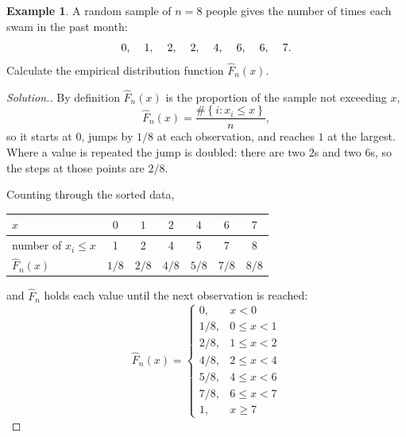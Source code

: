 \documentclass[11pt,a4paper]{article}
\theoremstyle{definition}
\newtheorem{example}[thm]{Example}
\newenvironment{solution}
  {\renewcommand{\qedsymbol}{}\begin{proof}[\textit{Solution}.]}
  {\end{proof}}
\begin{document}
\begin{example}
A random sample of $n=8$ people gives the number of times each swam in the past
month:
$$0,\hspace{0.4cm}1,\hspace{0.4cm}2,\hspace{0.4cm}2,\hspace{0.4cm}4,\hspace{0.4cm}6,\hspace{0.4cm}6,\hspace{0.4cm}7 .$$
Calculate the empirical distribution function $\widehat{F}_n(x)$.
\end{example}

\begin{solution}
By definition $\widehat{F}_n(x)$ is the proportion of the sample not exceeding $x$,
$$\widehat{F}_n(x)=\dfrac{\#\left\{i:x_i\leq x\right\}}{n},$$
so it starts at $0$, jumps by $1/8$ at each observation, and reaches $1$ at the
largest. Where a value is repeated the jump is doubled: there are two $2$s and two
$6$s, so the steps at those points are $2/8$.

Counting through the sorted data,

\begin{table}[H]
\centering
\begin{tabular}{l|cccccc}
$x$ &$0$&$1$&$2$&$4$&$6$&$7$\\
\hline
number of $x_i\leq x$ &1&2&4&5&7&8\\
$\widehat{F}_n(x)$ &$1/8$&$2/8$&$4/8$&$5/8$&$7/8$&$8/8$\\
\end{tabular}
\end{table}

and $\widehat{F}_n$ holds each value until the next observation is reached:
\[ \widehat{F}_n(x)=
\begin{cases}
0, & x<0\\
1/8, & 0\leq x<1\\
2/8, & 1\leq x<2\\
4/8, & 2\leq x<4\\
5/8, & 4\leq x<6\\
7/8, & 6\leq x<7\\
1, & x\geq 7
\end{cases}
\]
\end{solution}
\end{document}
